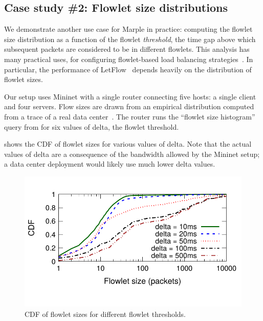 \subsection{Case study \#2: Flowlet size distributions}
\label{s:eval:mininet-flowlet}
\label{sec:eval:mininet-flowlet}

We demonstrate another use case for Marple in practice: computing the flowlet
size distribution as a function of the flowlet
\emph{threshold}, the time gap above which subsequent packets are considered to
be in different flowlets.
This analysis has many
practical uses, \eg for configuring flowlet-based load balancing
strategies~\cite{conga, letflow}.
In particular, the performance of LetFlow~\cite{letflow} depends heavily
on the distribution of flowlet sizes. 

Our setup uses Mininet with a single router connecting five hosts: a single
client and four servers. Flow sizes are drawn from an empirical distribution
computed from a trace of a real data center~\cite{empirical-flow-data}.  The
router runs the ``flowlet size histogram'' query from
 for six values of {\ct delta}, the flowlet
threshold.

 shows the CDF of flowlet sizes for various values of {\ct
delta}. Note that the actual values of {\ct delta} are a consequence of the
bandwidth allowed by the Mininet setup; a data center deployment would likely
use much lower {\ct delta} values.

\begin{figure}[!t]
\centering
\vspace{-0.2in}
\includegraphics[width=0.8\columnwidth]{pq_flowlet-cdf.pdf}
\vspace{-0.3in}
\caption{CDF of flowlet sizes for different flowlet thresholds.}
\vspace{-0.15in}
\label{fig:flowletcdf}
\end{figure}
